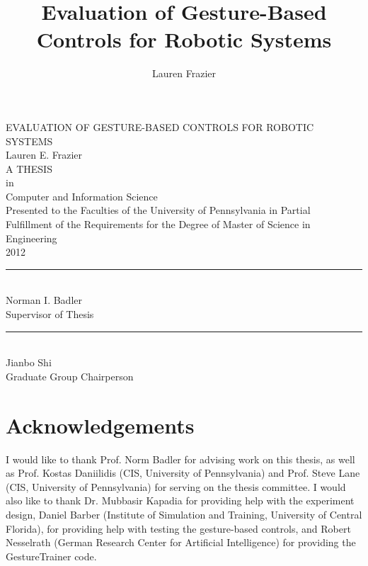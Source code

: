 \documentclass[12pt, letterpaper]{report}
\author{Lauren Frazier}
\title{Evaluation of Gesture-Based Controls for Robotic Systems}
\begin{document}
\begin{titlepage}
\begin{center}
{ \Large EVALUATION OF GESTURE-BASED CONTROLS FOR ROBOTIC SYSTEMS} \\[1cm]

{\Large Lauren E. Frazier} \\[1cm]

{A THESIS} \\[1cm]

in \\[1cm]

{\Large Computer and Information Science}\\[1.5cm]

{\normalsize Presented to the Faculties of the University of Pennsylvania in Partial\\ 
Fulfillment of the Requirements for the Degree of Master of Science in Engineering}\\[0.75cm]

2012 \\[1.5cm]

\singlespacing
\rule{0.6\linewidth}{0.1mm} \\
Norman I. Badler\\
Supervisor of Thesis \\[2cm]

\rule{0.6\linewidth}{0.1mm} \\
Jianbo Shi\\
Graduate Group Chairperson
\end{center}
\end{titlepage}
\doublespacing

\pagestyle{myheadings}
\markright{}
\tableofcontents
\setcounter{page}{2}
\listoftables
\listoffigures

\chapter*{Acknowledgements}
I would like to thank Prof. Norm Badler for advising work on this thesis, as well as Prof. Kostas Daniilidis (CIS, University of Pennsylvania) and Prof. Steve Lane (CIS, University of Pennsylvania) for serving on the thesis committee. I would also like to thank Dr. Mubbasir Kapadia for providing help with the experiment design, Daniel Barber (Institute of Simulation and Training, University of Central Florida), for providing help with testing the gesture-based controls, and Robert Nesselrath  (German Research Center for Artificial Intelligence) for providing the GestureTrainer code.
\end{document}
